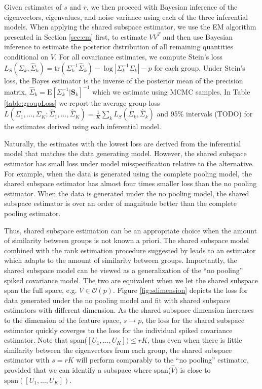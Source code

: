 \documentclass{article}
\newcommand{\bl}[1]{{\mathbf #1}}
\newcommand{\Exp}[1]{{\text{E}}[ \ensuremath{ #1 } ]  }
\begin{document}
Given estimates of $s$ and $r$, we then proceed with Bayesian
inference of the eigenvectors, eigenvalues, and noise variance using
each of the three inferential models.  When applying the shared
subspace estimator, we use the EM algorithm presented in Section
\ref{sec:em} first, to estimate $VV^T$ and then use Bayesian inference
to estimate the posterior distribution of all remaining quantities
conditional on $V$.  For all covariance estimates, we compute Stein's
loss
$L_S( \Sigma_k , \hat\Sigma_k) = \text{tr}( \Sigma_k^{-1} \hat
\Sigma_k ) - \log |\Sigma_k^{-1} \Sigma_k | - p$
for each group.  Under Stein's loss, the Bayes estimator is the
inverse of the posterior mean of the precision matrix,
$\hat \Sigma_{k} = \Exp{ \Sigma_k^{-1} | \bl S_k}^{-1}$ which we estimate
using MCMC samples.  In Table \ref{table:groupLoss} we report the
average group loss
$L(\Sigma_1, ..., \Sigma_K; \hat\Sigma_1, ..., \hat\Sigma_K ) =
\frac{1}{K} \sum_k L_S( \Sigma_k , \hat\Sigma_k)$
and 95\% intervals (TODO) for the estimates derived using each
inferential model.

Naturally, the estimates with the lowest loss are derived from the
inferential model that matches the data generating model. However, the
shared subspace estimator has small loss under model misspecification
relative to the alternative.  For example, when the data is
generated using the complete pooling model, the shared subspace
estimator has almost four times smaller loss than the no pooling
estimator.  When the data is generated under the no pooling model, the
shared subspace estimator is over an order of magnitude better than
the complete pooling estimator.

Thus, shared subspace estimation can be an appropriate choice when the
amount of similarity between groups is not known a priori.  The shared
subspace model combined with the rank estimation procedure suggested
by \citet{Gavish2014} leads to an estimator which adapts to the amount
of similarity between groups.  Importantly, the shared subspace model
can be viewed as a generalization of the ``no pooling'' spiked
covariance model.  The two are equivalent when we let
the shared subspace span the full space, e.g. $V \in \mathcal{O}(p)$.
Figure \ref{fig:sdimension} depicts the loss for data generated under
the no pooling model and fit with shared subspace estimators with
different dimension.  As the shared subspace dimension increases to
the dimension of the feature space, $s \rightarrow p$, the loss for
the shared subspace estimator quickly coverges to the loss for the
individual spiked covariance estimator.  Note that
span($[U_1, ..., U_K]) \leq rK$, thus even when there is little
similarity between the eigenvectors from each group, the shared
subspace estimator with $s = rK$ will perform comparably to the ``no
pooling'' estimator, provided that we can identify a subspace where
span($\hat{V})$ is close to $\text{span}([U_1, ..., U_K])$.
\end{document}
